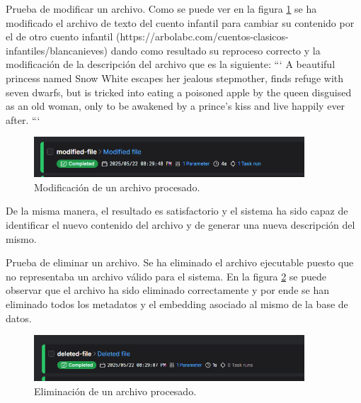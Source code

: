 Prueba de modificar un archivo. Como se puede ver en la figura \ref{fig:result_web_modified} se ha modificado el archivo de texto del cuento infantil para cambiar su contenido por el de otro cuento infantil (https://arbolabc.com/cuentos-clasicos-infantiles/blancanieves) dando como resultado su reproceso correcto y la modificación de la descripción del archivo que es la siguiente:
```
A beautiful princess named Snow White escapes her jealous stepmother, finds refuge with seven dwarfs, but is tricked into eating a poisoned apple by the queen disguised as an old woman, only to be awakened by a prince's kiss and live happily ever after.
```

\begin{figure}[H]
\centering
\includegraphics[width=0.9\textwidth]{archivos/result_web_modified.png}
\caption[Modificación de un archivo procesado]{Modificación de un archivo procesado.}
\label{fig:result_web_modified}
\end{figure}

De la misma manera, el resultado es satisfactorio y el sistema ha sido capaz de identificar el nuevo contenido del archivo y de generar una nueva descripción del mismo.

Prueba de eliminar un archivo. Se ha eliminado el archivo ejecutable puesto que no representaba un archivo válido para el sistema. En la figura \ref{fig:result_web_delete} se puede observar que el archivo ha sido eliminado correctamente y por ende se han eliminado todos los metadatos y el embedding asociado al mismo de la base de datos.
\begin{figure}[H]
\centering
\includegraphics[width=0.9\textwidth]{archivos/result_web_delete.png}
\caption[Eliminación de un archivo procesado]{Eliminación de un archivo procesado.}
\label{fig:result_web_delete}
\end{figure}


